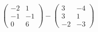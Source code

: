 \hspace*{2mm}\begin{minipage}[t]{\dimexpr\linewidth-2mm\relax}\vspace{0pt}
$\begin{pmatrix} -2 & 1 \\ -1 & -1 \\ 0 & 6 \end{pmatrix}-\begin{pmatrix} 3 & -4 \\ 3 & 1 \\ -2 & -3 \end{pmatrix}$\end{minipage}
